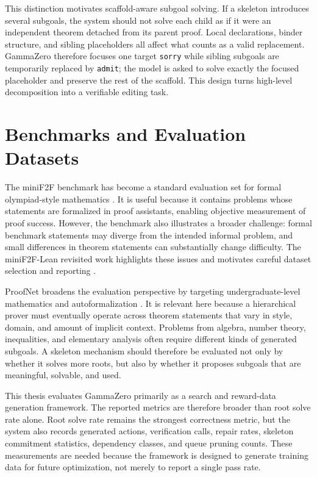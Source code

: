This distinction motivates scaffold-aware subgoal solving. If a skeleton introduces several subgoals,
the system should not solve each child as if it were an independent theorem detached from its parent
proof. Local declarations, binder structure, and sibling placeholders all affect what counts as a valid
replacement. GammaZero therefore focuses one target \texttt{sorry} while sibling subgoals are temporarily
replaced by \texttt{admit}; the model is asked to solve exactly the focused placeholder and preserve the rest of the
scaffold. This design turns high-level decomposition into a verifiable editing task.

\section{Benchmarks and Evaluation Datasets}

The miniF2F benchmark has become a standard evaluation set for formal olympiad-style mathematics
\citep{zheng2021minif2f}. It is useful because it contains problems whose statements are formalized in
proof assistants, enabling objective measurement of proof success. However, the benchmark also
illustrates a broader challenge: formal benchmark statements may diverge from the intended informal
problem, and small differences in theorem statements can substantially change difficulty. The
miniF2F-Lean revisited work highlights these issues and motivates careful dataset selection and reporting
\citep{ospanov2025minif2fLeanRevisited}.

ProofNet broadens the evaluation perspective by targeting undergraduate-level mathematics and
autoformalization \citep{azerbayev2023proofnet}. It is relevant here because a hierarchical prover must
eventually operate across theorem statements that vary in style, domain, and amount of implicit context.
Problems from algebra, number theory, inequalities, and elementary analysis often require different kinds
of generated subgoals. A skeleton mechanism should therefore be evaluated not only by whether it solves
more roots, but also by whether it proposes subgoals that are meaningful, solvable, and used.

This thesis evaluates GammaZero primarily as a search and reward-data generation framework. The
reported metrics are therefore broader than root solve rate alone. Root solve rate remains the strongest
correctness metric, but the system also records generated actions, verification calls, repair rates,
skeleton commitment statistics, dependency classes, and queue pruning counts. These measurements are
needed because the framework is designed to generate training data for future optimization, not merely to
report a single pass rate.

